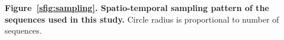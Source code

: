\documentclass[a4paper,10pt]{article}
\begin{document}
\textbf{Figure~\ref{sfig:sampling}. Spatio-temporal sampling pattern of the sequences used in this study.} Circle radius is proportional to number of sequences.

% 
% 
% 
% 
\end{document}
